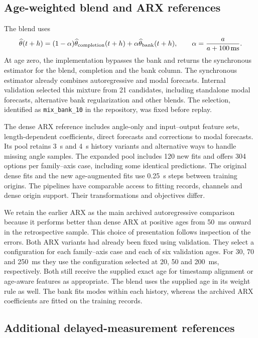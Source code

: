 \subsection{Age-weighted blend and ARX references}

The blend uses
\begin{equation}
 \widehat\theta(t+h)=(1-\alpha)\widehat\theta_{\rm completion}(t+h)
                    +\alpha\widehat\theta_{\rm bank}(t+h),
 \qquad \alpha=\frac{a}{a+100\,\mathrm{ms}} .
 \label{eq:mixture}
\end{equation}
At age zero, the implementation bypasses the bank and returns the synchronous estimator for the blend, completion and the bank column. The synchronous estimator already combines autoregressive and modal forecasts. Internal validation selected this mixture from 21 candidates, including standalone modal forecasts, alternative bank regularization and other blends. The selection, identified as \texttt{mix\_bank\_10} in the repository, was fixed before replay.

The dense ARX reference includes angle-only and input--output feature sets, length-dependent coefficients, direct forecasts and corrections to modal forecasts. Its pool retains 3~s and 4~s history variants and alternative ways to handle missing angle samples. The expanded pool includes 120 new fits and offers 304 options per family--axis case, including some identical predictions. The original dense fits and the new age-augmented fits use 0.25~s steps between training origins. The pipelines have comparable access to fitting records, channels and dense origin support. Their transformations and objectives differ.

We retain the earlier ARX as the main archived autoregressive comparison because it performs better than dense ARX at positive ages from 50~ms onward in the retrospective sample. This choice of presentation follows inspection of the errors. Both ARX variants had already been fixed using validation. They select a configuration for each family--axis case and each of six validation ages. For 30, 70 and 250~ms they use the configuration selected at 20, 50 and 200~ms, respectively. Both still receive the supplied exact age for timestamp alignment or age-aware features as appropriate. The blend uses the supplied age in its weight rule as well. The bank fits modes within each history, whereas the archived ARX coefficients are fitted on the training records.

\subsection{Additional delayed-measurement references}
\label{sec:added-baselines}

